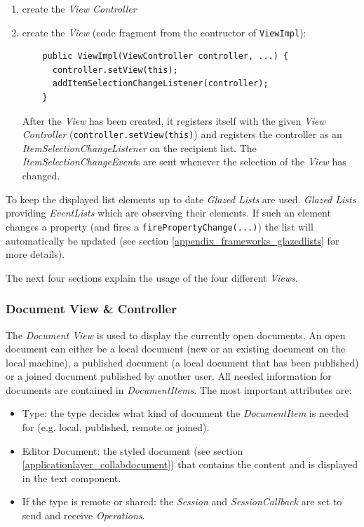 \begin{enumerate}
\item create the \textit{View Controller}
\item create the \textit{View} (code fragment from the contructor of \texttt{ViewImpl}):

  \begin{verbatim}
    public ViewImpl(ViewController controller, ...) {
      controller.setView(this);
      addItemSelectionChangeListener(controller);
    }
  \end{verbatim}
  
After the \textit{View} has been created, it registers itself with the given \textit{View Controller} (\texttt{controller.setView(this)}) and registers the controller as an \emph{Item\-Selection\-Change\-Listener} on the recipient list. The \emph{Item\-Selection\-Change\-Event}s are sent whenever the selection of the \textit{View} has changed.
\end{enumerate}

To keep the displayed list elements up to date \textit{Glazed Lists} are used. \textit{Glazed Lists} providing \textit{EventLists} which are observing their elements. If such an element changes a property (and fires a \texttt{firePropertyChange(...)}) the list will automatically be updated (see section \ref{appendix_frameworks_glazedlists} for more details).

The next four sections explain the usage of the four different \textit{Views}.

\subsubsection{Document View \& Controller}
The \textit{Document View} is used to display the currently open documents. An open document can either be a local document (new or an existing document on the local machine), a published document (a local document that has been published) or a joined document published by another user. All needed information for documents are contained in \textit{DocumentItems}. The most important attributes are:

\begin{itemize}
\item Type: the type decides what kind of document the \textit{DocumentItem} is needed for (e.g. local, published, remote or joined).
\item Editor Document: the styled document (see section \ref{applicationlayer_collabdocument}) that contains the content and is displayed in the text component.
\item If the type is remote or shared: the \textit{Session} and \textit{SessionCallback} are set to send and receive \textit{Operations}.
\end{itemize}

